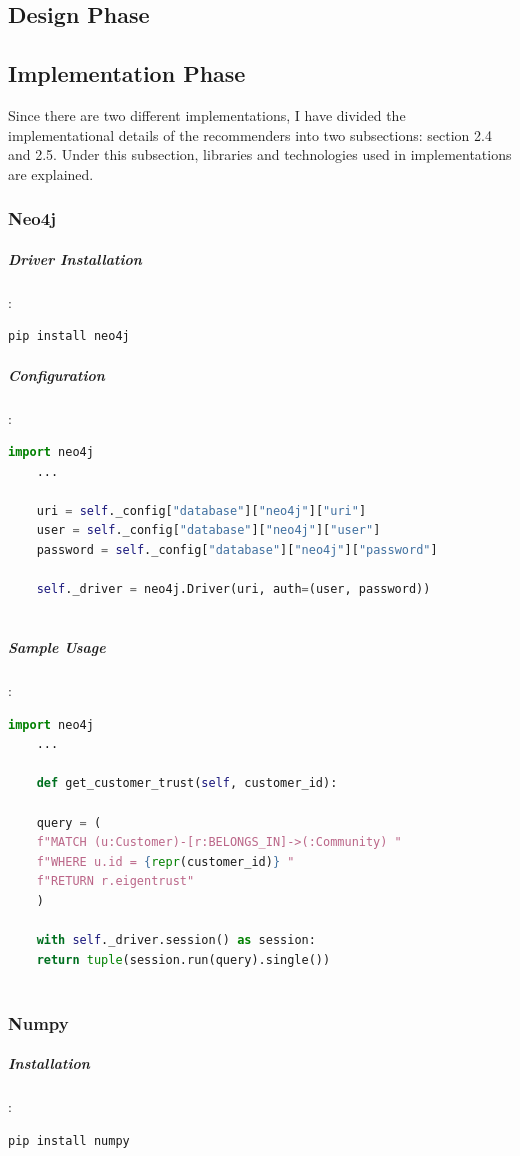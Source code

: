 \documentclass[12pt]{article}
\begin{document}
	\subsection{Design Phase}
	\subsection{Implementation Phase}
	Since there are two different implementations, I have divided the implementational details of the recommenders into two subsections: section 2.4 and 2.5. Under this subsection, libraries and technologies used in implementations are explained.
	\subsubsection{Neo4j}
	\subparagraph{Driver Installation}:
	\begin{lstlisting}[language=bash]
	pip install neo4j
	\end{lstlisting}
	
	\subparagraph{Configuration}:
	\begin{lstlisting}[language=python]
	import neo4j
	...
	
	uri = self._config["database"]["neo4j"]["uri"]
	user = self._config["database"]["neo4j"]["user"]
	password = self._config["database"]["neo4j"]["password"]
	
	self._driver = neo4j.Driver(uri, auth=(user, password))
	
	\end{lstlisting}
	
	\subparagraph{Sample Usage}:
	\begin{lstlisting}[language=python, caption=Neo4j driver example]
	import neo4j
	...
	
	def get_customer_trust(self, customer_id):
	
	query = (
	f"MATCH (u:Customer)-[r:BELONGS_IN]->(:Community) "
	f"WHERE u.id = {repr(customer_id)} "
	f"RETURN r.eigentrust"
	)
	
	with self._driver.session() as session:
	return tuple(session.run(query).single())
	
	\end{lstlisting}
	
	\subsubsection{Numpy}
	\subparagraph{Installation}:
	\begin{lstlisting}[language=bash]
	pip install numpy
	\end{lstlisting}
	
\end{document}
